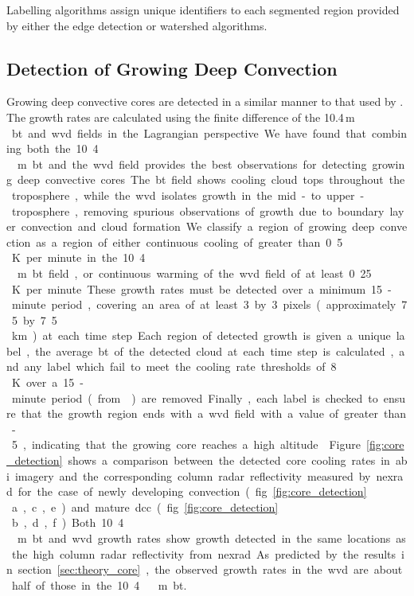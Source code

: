 Labelling algorithms assign unique identifiers to each segmented region provided by either the edge detection or watershed algorithms.


\subsection{Detection of Growing Deep Convection} \label{sec:core_detection}

Growing deep convective cores are detected in a similar manner to that used by \citet{zinner_cb-tram_2008}.
The growth rates are calculated using the finite difference of the 10.4\,\unit{\mu m } \acrshort{bt} and \acrshort{wvd} fields in the Lagrangian perspective.
We have found that combining both the 10.4\,\unit{\mu m} \acrshort{bt} and the \acrshort{wvd} field provides the best observations for detecting growing deep convective cores.
The \acrshort{bt} field shows cooling cloud tops throughout the troposphere, while the \acrshort{wvd} isolates growth in the mid- to upper-troposphere, removing spurious observations of growth due to boundary layer convection and cloud formation.

We classify a region of growing deep convection as a region of either continuous cooling of greater than 0.5\,\unit{K} per minute in the 10.4\,\unit{\mu m} \acrshort{bt} field, or continuous warming of the \acrshort{wvd} field of at least 0.25\,\unit{K} per minute.
These growth rates must be detected over a minimum 15-minute period, covering an area of at least 3 by 3 pixels (approximately 7.5 by 7.5\,\unit{km}) at each time step.
Each region of detected growth is given a unique label, the average \acrshort{bt} of the detected cloud at each time step is calculated, and any label which fail to meet the cooling rate thresholds of 8\,\unit{K} over a 15-minute period (from \citep{roberts_nowcasting_2003, hartung_intercomparison_2013}) are removed.
Finally, each label is checked to ensure that the growth region ends with a \acrshort{wvd} field with a value of greater than -5, indicating that the growing core reaches a high altitude \citep{muller_role_2018}.

Figure~\ref{fig:core_detection} shows a comparison between the detected core cooling rates in \acrshort{abi} imagery and the corresponding column radar reflectivity measured by \acrshort{nexrad} for the case of newly developing convection (fig.~\ref{fig:core_detection}\,a,c,e) and mature \acrshort{dcc} (fig.~\ref{fig:core_detection}\,b,d,f)
Both 10.4\,\unit{\mu m} \acrshort{bt} and \acrshort{wvd} growth rates show growth detected in the same locations as the high column radar reflectivity from \acrshort{nexrad}.
As predicted by the results in section~\ref{sec:theory_core}, the observed growth rates in the \acrshort{wvd} are about half of those in the 10.4\,\unit{\mu m} \acrshort{bt}.


